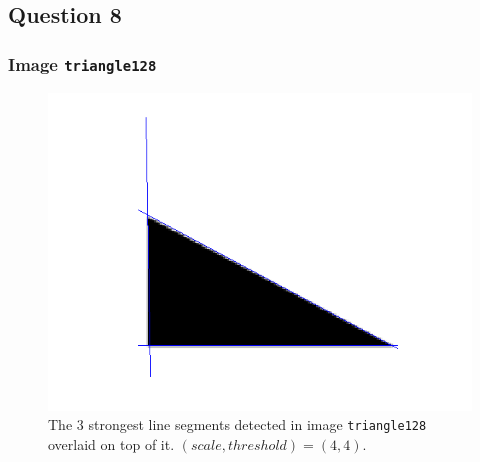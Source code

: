 \subsection{Question 8}

  \subsubsection{Image \texttt{triangle128}}

    \begin{figure}[H]
      \centering
      \includegraphics[scale=0.8]{./images/Q8/triangle128/1.png}
      \caption{The $3$ strongest line segments detected in image
        \texttt{triangle128} overlaid on top of it. $(scale, threshold) = (4,4)$.}
      \label{fig:Q8_triangle128_1}
    \end{figure}

